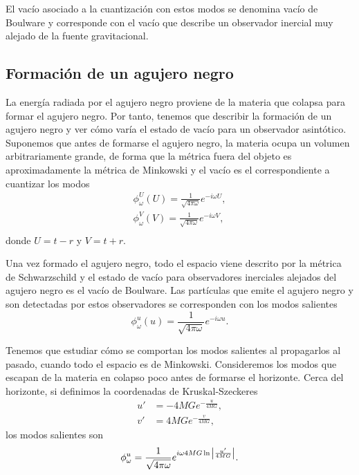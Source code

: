 El vacío asociado a la cuantización con estos modos se denomina vacío de Boulware y 
corresponde con el vacío que describe un observador inercial muy alejado de la fuente
gravitacional.

\subsection{Formación de un agujero negro}

La energía radiada por el agujero negro proviene de la materia que colapsa para formar el agujero negro.
Por tanto, tenemos que describir la formación de un agujero negro y ver cómo varía el estado de vacío
para un observador asintótico.
Suponemos que antes de formarse el agujero negro, la materia ocupa un volumen arbitrariamente grande,
de forma que la métrica fuera del objeto es aproximadamente la métrica de Minkowski y el vacío es el correspondiente
a cuantizar los modos
\begin{equation}
  \begin{gathered}
    \phi_\omega^U (U)=\frac{1}{\sqrt{4\pi\omega}} e^{-i\omega U},\\
    \phi_\omega^V (V)=\frac{1}{\sqrt{4\pi\omega}} e^{-i\omega V},\\
  \end{gathered}
\end{equation}
donde $U=t-r$ y $V=t+r$.

Una vez formado el agujero negro, todo el espacio viene descrito por la métrica de Schwarzschild y
el estado de vacío para observadores inerciales alejados del agujero negro es el vacío de Boulware.
Las partículas que emite el agujero negro y son detectadas por estos observadores se corresponden con los
modos salientes
\begin{equation}
  \phi^u_\omega(u) = \frac{1}{\sqrt{4\pi \omega}}e^{-i\omega u}.
\end{equation}

Tenemos que estudiar cómo se comportan los modos salientes al propagarlos al pasado, cuando todo
el espacio es de Minkowski.
Consideremos los modos que escapan de la materia en colapso poco antes de formarse el horizonte.
Cerca del horizonte, si definimos la coordenadas de Kruskal-Szeckeres
\begin{equation}
  \begin{aligned}
    u'&=-4MGe^{-\frac{u}{4MG}},\\
    v'&=4MGe^{-\frac{v}{4MG}},
  \end{aligned}
\end{equation}
los modos salientes son
\begin{equation}
  \phi^{u}_\omega = \frac{1}{\sqrt{4\pi\omega}}e^{i\omega 4MG\ln \abs{\frac{u'}{4MG}}}.
\end{equation}

